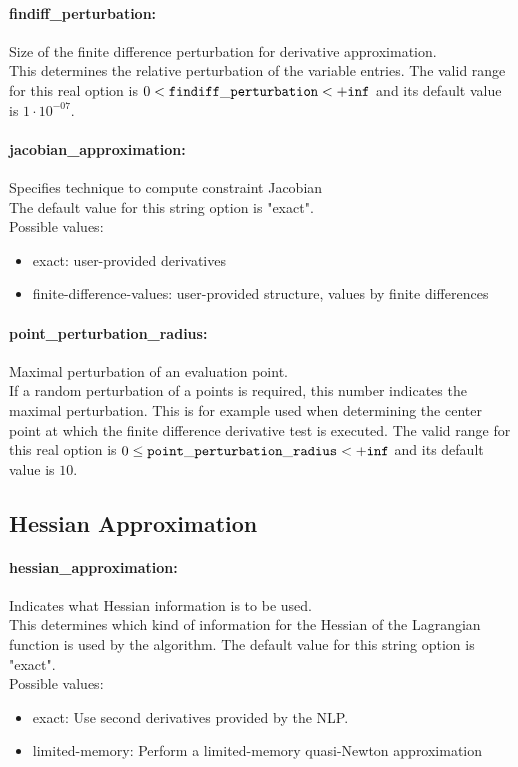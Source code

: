 \paragraph{findiff\_perturbation:}\label{sec:findiff_perturbation} Size of the finite difference perturbation for derivative approximation. $\;$ \\
 This determines the relative perturbation of the
variable entries. The valid range for this real option is 
$0 <  {\tt findiff\_perturbation } <  {\tt +inf}$
and its default value is $1 \cdot 10^{-07}$.


\paragraph{jacobian\_approximation:}\label{sec:jacobian_approximation} Specifies technique to compute constraint Jacobian $\;$ \\

The default value for this string option is "exact".
\\ 
Possible values:
\begin{itemize}
   \item exact: user-provided derivatives
   \item finite-difference-values: user-provided structure, values by finite
differences
\end{itemize}

\paragraph{point\_perturbation\_radius:}\label{sec:point_perturbation_radius} Maximal perturbation of an evaluation point. $\;$ \\
 If a random perturbation of a points is required,
this number indicates the maximal perturbation. 
This is for example used when determining the
center point at which the finite difference
derivative test is executed. The valid range for this real option is 
$0 \le {\tt point\_perturbation\_radius } <  {\tt +inf}$
and its default value is $10$.


\subsection{Hessian Approximation}
\label{sec:Hessian_Approximation}
\paragraph{hessian\_approximation:}\label{sec:hessian_approximation} Indicates what Hessian information is to be used. $\;$ \\
 This determines which kind of information for the
Hessian of the Lagrangian function is used by the
algorithm.
The default value for this string option is "exact".
\\ 
Possible values:
\begin{itemize}
   \item exact: Use second derivatives provided by the NLP.
   \item limited-memory: Perform a limited-memory quasi-Newton
approximation
\end{itemize}

